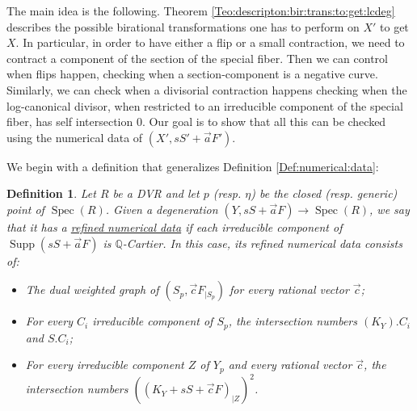 \documentclass[11pt]{amsart}
\newcommand{\spec}{\operatorname{Spec}}
\newcommand{\supp}{\operatorname{Supp}}
\newtheorem{Def}[theorem]{Definition}
\theoremstyle{definition}
\begin{document}
The main idea is the following. Theorem \ref{Teo:descripton:bir:trans:to:get:lcdeg} describes the possible birational transformations
one has to perform on $X'$ to get $X$.
In particular, in order to have either a flip or a small contraction, we need to contract a component of the section of the special fiber.
Then we can control when flips happen, checking when a section-component is a negative curve. Similarly, we can check when a divisorial contraction
happens checking when the log-canonical divisor, when restricted to an irreducible component of the special fiber, has self intersection 0.
Our
goal is to show that all this
can be checked using the numerical data of $(X',sS'+\vec{a}F')$.

We begin with a definition that generalizes Definition \ref{Def:numerical:data}:
\begin{Def}\label{Def:refined:num:data}
Let $R$ be a DVR and let $p$ (resp. $\eta$) be the closed (resp. generic) point of $\spec(R)$.
 Given a degeneration $(Y,sS+\vec{a}F) \to \spec(R)$, we say that it has a \underline{refined numerical data} if each irreducible
 component of $\supp(sS+\vec{a}F)$ is $\mathbb{Q}$-Cartier. In this case, its refined numerical data consists of:
 \begin{itemize}
  \item The dual weighted graph of $(S_p,\vec{c}F_{|S_p})$ for every rational vector $\vec{c}$;
  \item For every $C_i$ irreducible component of $S_p$,
  the intersection numbers $(K_{Y}).C_i$ and $S.C_i$;
  \item For every irreducible component $Z$ of $Y_p$ and every rational vector $\vec{c}$, the intersection numbers
  $((K_{Y}+sS+\vec{c}F)_{|Z})^2$.
 \end{itemize}
\end{Def}
\end{document}
